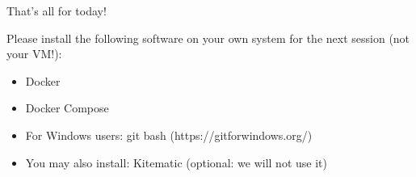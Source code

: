 \documentclass[handout]{beamer}[10pt, usepdftitle=false]
\begin{document}
	\begin{frame}
	
	That's all for today!
	\vspace*{0.6em}
	
	Please install the following software on your own system for the next session (not your VM!):
	\begin{itemize}
	\item{Docker}
	\item{Docker Compose}
	\item{For Windows users: git bash (https://gitforwindows.org/)}
	\item{You may also install: Kitematic (optional: we will not use it)}
	\end{itemize}		
		
	
	
	
			
	
		
	
	\end{frame}
	
\end{document}

